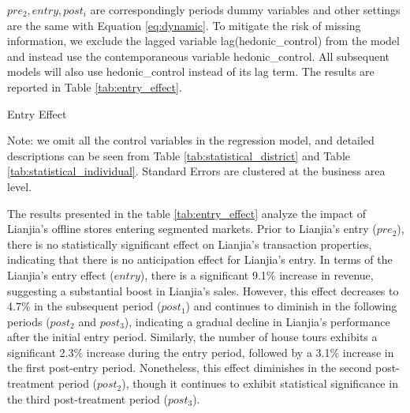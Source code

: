 \documentclass[11pt]{article}
\begin{document}
$pre_2, entry, post_i$ are correspondingly periods dummy variables and other settings are the same with Equation \eqref{eq:dynamic}. To mitigate the risk of missing information, we exclude the lagged variable lag(hedonic\_control) from the model and instead use the contemporaneous variable hedonic\_control. All subsequent models will also use hedonic\_control instead of its lag term. The results are reported in Table \ref{tab:entry_effect}.

\begin{table}[htb!]
  \begin{center}
    \begin{scriptsize}
    \caption{Entry Effect}
    \label{tab:entry_effect}
      
    
    Note: we omit all the control variables in the regression model, and detailed descriptions can be seen from Table \ref{tab:statistical_district} and Table \ref{tab:statistical_individual}. Standard Errors are clustered at the business area level.
    \end{scriptsize}
  \end{center}
\end{table}

The results presented in the table \ref{tab:entry_effect} analyze the impact of Lianjia's offline stores entering segmented markets. Prior to Lianjia's entry ($pre_2$), there is no statistically significant effect on Lianjia's transaction properties, indicating that there is no anticipation effect for Lianjia's entry. In terms of the Lianjia's entry effect ($entry$), there is a significant 9.1\% increase in revenue, suggesting a substantial boost in Lianjia's sales. However, this effect decreases to 4.7\% in the subsequent period ($post_1$) and continues to diminish in the following periods ($post_2$ and $post_3$), indicating a gradual decline in Lianjia's performance after the initial entry period. Similarly, the number of house tours exhibits a significant 2.3\% increase during the entry period, followed by a 3.1\% increase in the first post-entry period. Nonetheless, this effect diminishes in the second post-treatment period ($post_2$), though it continues to exhibit statistical significance in the third post-treatment period ($post_3$). %
\end{document}
